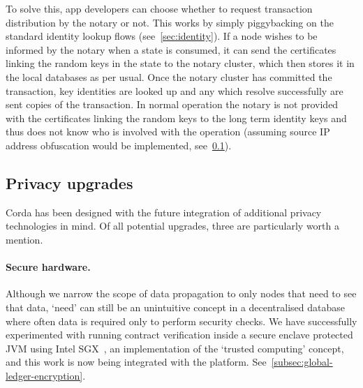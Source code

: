 \documentclass{article}
\begin{document}
To solve this, app developers can choose whether to request transaction distribution by the notary or not. This
works by simply piggybacking on the standard identity lookup flows (see~\cref{sec:identity}). If a node
wishes to be informed by the notary when a state is consumed, it can send the certificates linking the random keys
in the state to the notary cluster, which then stores it in the local databases as per usual. Once the notary
cluster has committed the transaction, key identities are looked up and any which resolve successfully are sent
copies of the transaction. In normal operation the notary is not provided with the certificates linking the random
keys to the long term identity keys and thus does not know who is involved with the operation (assuming source IP
address obfuscation would be implemented, see~\cref{subsec:privacy-upgrades}).

\subsection{Privacy upgrades}\label{subsec:privacy-upgrades}

Corda has been designed with the future integration of additional privacy technologies in mind. Of all potential
upgrades, three are particularly worth a mention.

\paragraph{Secure hardware.}Although we narrow the scope of data propagation to only nodes that need to see that
data, `need' can still be an unintuitive concept in a decentralised database where often data is required only to
perform security checks. We have successfully experimented with running contract verification inside a secure
enclave protected JVM using Intel SGX\texttrademark~, an implementation of the `trusted computing'
concept\cite{mitchell2005trusted}, and this work is now being integrated with the platform.
See~\cref{subsec:global-ledger-encryption}.
\end{document}
